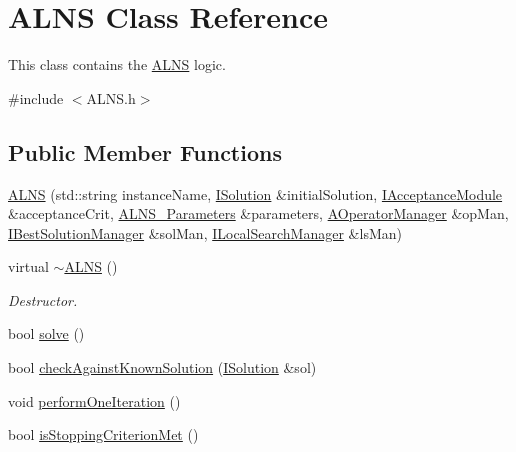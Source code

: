 \hypertarget{classALNS}{\section{\-A\-L\-N\-S \-Class \-Reference}
\label{classALNS}
}


\-This class contains the \hyperlink{classALNS}{\-A\-L\-N\-S} logic.  




{\ttfamily \#include $<$\-A\-L\-N\-S.\-h$>$}

\subsection*{\-Public \-Member \-Functions}
\begin{DoxyCompactItemize}
\item 
\hyperlink{classALNS_a73b1c0d89a08733cf96b8bd3bd3b1ee0}{\-A\-L\-N\-S} (std\-::string instance\-Name, \hyperlink{classISolution}{\-I\-Solution} \&initial\-Solution, \hyperlink{classIAcceptanceModule}{\-I\-Acceptance\-Module} \&acceptance\-Crit, \hyperlink{classALNS__Parameters}{\-A\-L\-N\-S\-\_\-\-Parameters} \&parameters, \hyperlink{classAOperatorManager}{\-A\-Operator\-Manager} \&op\-Man, \hyperlink{classIBestSolutionManager}{\-I\-Best\-Solution\-Manager} \&sol\-Man, \hyperlink{classILocalSearchManager}{\-I\-Local\-Search\-Manager} \&ls\-Man)
\item 
\hypertarget{classALNS_a981532332c893575df882950ba108420}{virtual \hyperlink{classALNS_a981532332c893575df882950ba108420}{$\sim$\-A\-L\-N\-S} ()}\label{classALNS_a981532332c893575df882950ba108420}

\begin{DoxyCompactList}\small\item\em \-Destructor. \end{DoxyCompactList}\item 
bool \hyperlink{classALNS_a02bfc43130ca878023ab85da3990aee8}{solve} ()
\item 
bool \hyperlink{classALNS_a603d6dfef21bcb16cb0d4e0ee70dcad8}{check\-Against\-Known\-Solution} (\hyperlink{classISolution}{\-I\-Solution} \&sol)
\item 
void \hyperlink{classALNS_af86fb8b68cd36fc947c53d53edf37841}{perform\-One\-Iteration} ()
\item 
\hypertarget{classALNS_a914ea0dff7f09b5fd5da9ab8040515a7}{bool \hyperlink{classALNS_a914ea0dff7f09b5fd5da9ab8040515a7}{is\-Stopping\-Criterion\-Met} ()}\label{classALNS_a914ea0dff7f09b5fd5da9ab8040515a7}


\end{DoxyCompactItemize}
